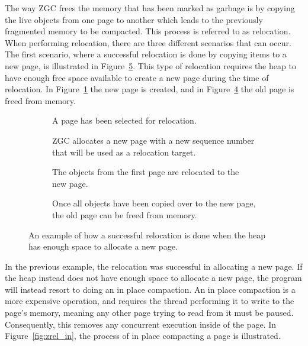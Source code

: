 The way ZGC frees the memory that has been marked as garbage is by copying the live objects from one page to another which leads to the previously fragmented memory to be compacted. This process is referred to as relocation. When performing relocation, there are three different scenarios that can occur. The first scenario, where a successful relocation is done by copying items to a new page, is illustrated in Figure~\ref{fig:zrel_new}. This type of relocation requires the heap to have enough free space available to create a new page during the time of relocation. In Figure~\ref*{fig:zrel_new1} the new page is created, and in Figure~\ref*{fig:zrel_new3} the old page is freed from memory.

\begin{figure}[H]
    \centering
    \begin{subfigure}[t]{.2\textwidth}
        \centering
        
        \caption{A page has been selected for relocation.}
        \label{fig:zrel_new1}
    \end{subfigure}%
    \hfill\vline\hfill
    \begin{subfigure}[t]{.2\textwidth}
        \centering
        
        \caption{ZGC allocates a new page with a new sequence number that will be used as a relocation target.}
        \label{fig:zrel_new2}
    \end{subfigure}%
    \hfill\vline\hfill
    \begin{subfigure}[t]{.2\textwidth}
        \centering
        
        \caption{The objects from the first page are relocated to the new page.}
        \label{fig:zrel_new3}
    \end{subfigure}%
    \hfill\vline\hfill
    \begin{subfigure}[t]{.2\textwidth}
        \centering
        
        \caption{Once all objects have been copied over to the new page, the old page can be freed from memory.}
        \label{fig:zrel_new3}
    \end{subfigure}%
    \caption{An example of how a successful relocation is done when the heap has enough space to allocate a new page.}
    \label{fig:zrel_new}
\end{figure}

In the previous example, the relocation was successful in allocating a new page. If the heap instead does not have enough space to allocate a new page, the program will instead resort to doing an in place compaction. An in place compaction is a more expensive operation, and requires the thread performing it to write to the page's memory, meaning any other page trying to read from it must be paused. Consequently, this removes any concurrent execution inside of the page. In Figure~\ref{fig:zrel_in}, the process of in place compacting a page is illustrated. 

